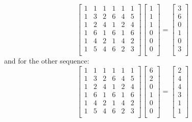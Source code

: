 \documentclass[11pt]{article}
\newenvironment{qparts}{\begin{enumerate}[{(}a{)}]}{\end{enumerate}}
\begin{document}
\begin{qparts}
\[
\begin{bmatrix}
    1       & 1 & 1 & 1 & 1 & 1 \\
    1       & 3 & 2 & 6 & 4 & 5 \\
    1       & 2 & 4 & 1 & 2 & 4 \\
    1       & 6 & 1 & 6 & 1 & 6 \\
    1       & 4 & 2 & 1 & 4 & 2 \\
    1       & 5 & 4 & 6 & 2 & 3 \\
\end{bmatrix}
\begin{bmatrix}
1 \\
1 \\
1 \\
0 \\
0 \\
0 \\
\end{bmatrix} = 
\begin{bmatrix}
3 \\
6 \\
0 \\
1 \\
0 \\
3 \\
\end{bmatrix}
\]
and for the other sequence: 
\[
\begin{bmatrix}
    1       & 1 & 1 & 1 & 1 & 1 \\
    1       & 3 & 2 & 6 & 4 & 5 \\
    1       & 2 & 4 & 1 & 2 & 4 \\
    1       & 6 & 1 & 6 & 1 & 6 \\
    1       & 4 & 2 & 1 & 4 & 2 \\
    1       & 5 & 4 & 6 & 2 & 3 \\
\end{bmatrix}
\begin{bmatrix}
6 \\
2 \\
0 \\
1 \\
0 \\
0 \\
\end{bmatrix} = 
\begin{bmatrix}
2 \\
4 \\
4 \\
3 \\
1 \\
1 \\
\end{bmatrix}
\]


\end{qparts}
\end{document}
